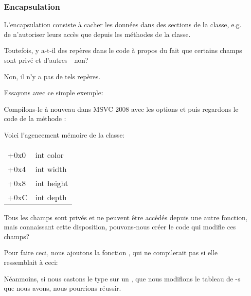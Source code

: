 \subsubsection{Encapsulation}

L'encapsulation consiste à cacher les données dans des sections  de la
classe, e.g. de n'autoriser leurs accès que depuis les méthodes de la classe.

Toutefois, y a-t-il des repères dans le code à propos du fait que certains champs
sont privé et d'autres---non?

Non, il n'y a pas de tels repères.

Essayons avec ce simple exemple:



Compilons-le à nouveau dans MSVC 2008 avec les options \Ox et \Obzero puis regardons
le code de la méthode :



Voici l'agencement mémoire de la classe:

\begin{center}
\begin{tabular}{ | l | l | }
\hline
  \tableheader{} \\
\hline
  +0x0 & int color \\
\hline
  +0x4 & int width \\
\hline
  +0x8 & int height \\
\hline
  +0xC & int depth \\
\hline
\end{tabular}
\end{center}

Tous les champs sont privés et ne peuvent être accédés depuis une autre fonction,
mais connaissant cette disposition, pouvons-nous créer le code qui modifie ces champs?

Pour faire ceci, nous ajoutons la fonction , qui ne
compilerait pas si elle ressemblait à ceci:



Néanmoins, si nous castons le type  sur un ,
que nous modifions le tableau de \Tint{}-s que nous avons, nous pourrions réussir.



